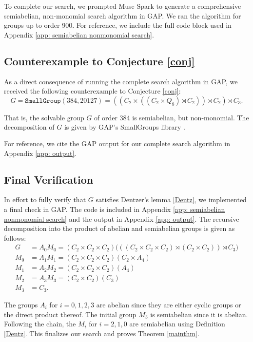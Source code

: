 \documentclass[11pt]{article}
\theoremstyle{definition}
\numberwithin{equation}{section}
\begin{document}
\begin{humanblock}


To complete our search, we prompted Muse Spark to generate a comprehensive semiabelian, non-monomial search algorithm in {\ttfamily \large GAP}. We ran the algorithm for groups up to order 900. For reference, we include the full code block used in Appendix \ref{app: semiabelian nonmonomial search}. 
\subsection{Counterexample to Conjecture \ref{conj}}
As a direct consequence of running the complete search algorithm in {\ttfamily \large GAP}, we received the following counterexample to Conjecture \ref{conj}:
\[  
G = \texttt{SmallGroup}(384,20127) = ((C_2 \times ((C_2 \times Q_8) \rtimes C_2)) \rtimes C_2) \rtimes C_3.  
\]


That is, the solvable group $G$ of order 384 is semiabelian, but non-monomial. The decomposition of $G$ is given by {\ttfamily \large GAP}'s SmallGroups library \cite{SmallGrp}. 

For reference, we cite the {\ttfamily \large GAP} output for our complete search algorithm in Appendix \ref{app: output}.


\subsection{Final Verification} In effort to fully verify that $G$ satisfies Dentzer's lemma \ref{Dentz}, we implemented a final check in {\ttfamily \large GAP}. The code is included in Appendix \ref{app: semiabelian nonmonomial search} and the output in Appendix \ref{app: output}. The recursive decomposition into the product of abelian and semiabelian groups is given as follows:
\begin{align*}
G &= A_0 M_0 = (C_2 \times C_2 \times C_2)\big(((C_2 \times C_2 \times C_2) \rtimes (C_2 \times C_2)) \rtimes C_3\big)\\
M_0 &= A_1 M_1 = (C_2 \times C_2 \times C_2)(C_2 \times A_4)\\
M_1 &= A_2 M_2 = (C_2 \times C_2 \times C_2)(A_4)\\
M_2 &= A_3 M_3 = (C_2 \times C_2)(C_3)\\
M_3 &= C_3.
\end{align*}

The groups $A_i$ for $i = 0, 1, 2, 3$ are abelian since they are either cyclic groups or the direct product thereof. The initial group $M_3$ is semiabelian since it is abelian. Following the chain, the $M_i$ for $i = 2, 1, 0$ are semiabelian using Definition \ref{Dentz}. This finalizes our search and proves Theorem \ref{mainthm}.




\end{humanblock}
\end{document}
